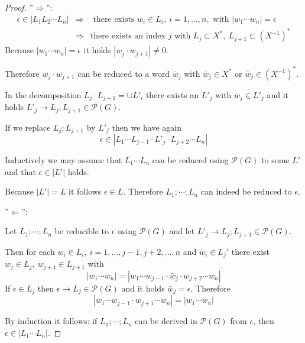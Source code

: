 \begin{proof}

''$\Rightarrow$'':
\begin{eqnarray*}
\epsilon \in |L_1 L_2 \cdots L_n| & \Rightarrow & \text{ there exists } w_i \in
L_i,\ i = 1, \ldots, n,\text{ with }|w_1 \cdots w_n| = \epsilon \\
& \Rightarrow & \text{there exists an index $j$ with }L_j \subset X^*,\ L_{j+1}
\subset (X^{-1})^*
\end{eqnarray*}
Because $|w_1 \cdots w_n| = \epsilon$ it holds $|w_j \cdot w_{j+1}| \neq 0$.

Therefore $w_j \cdot w_{j+1}$ can be reduced to a word $\bar{w}_j$ with
$\bar{w}_j \in X^*$ or $\bar{w}_j \in (X^{-1})^*$.

In the decomposition $L_j \cdot L_{j+1} = \cup L'_i$ there exists an $L'_j$ with
$\bar{w}_j \in L'_j$ and it holds $L'_j \to L_j;L_{j+1} \in \mathcal{P}(G)$.

If we replace $L_j;L_{j+1}$ by $L'_j$ then we have again
\[ \epsilon \in |L_1 \cdots L_{j-1} \cdot L'_j \cdot L_{j+2} \cdots L_n| \]

Inductively we may assume that $L_1 \cdots L_n$ can be reduced using
$\mathcal{P}(G)$ to some $L'$ and that $\epsilon \in |L'|$ holds.

Because $|L'| = L$ it follows $\epsilon \in L$. Therefore $L_1; \cdots ;L_n$ can
indeed be reduced to $\epsilon$.

''$\Leftarrow$'':

Let $L_1; \cdots ;L_n$ be reducible to $\epsilon$ using $\mathcal{P}(G)$ and let
$L'_j \to L_j;L_{j+1} \in \mathcal{P}(G)$.

Then for each $w_i \in L_i,\ i = 1, \ldots, j-1, j+2, \ldots, n$ and $\bar{w}_i
\in L_j'$ there exist $w_j \in L_j,\ w_{j+1} \in L_{j+1}$ with
\[ |w_1 \cdots w_n| = |w_1 \cdots w_{j-1} \cdot \bar{w}_j \cdot w_{j+2} \cdots
w_n|
\]
If $\epsilon \in L_j$ then $\epsilon \to L_j \in \mathcal{P}(G)$ and it holds
$\bar{w}_j = \epsilon$. Therefore
\[ |w_1 \cdots w_{j-1} \cdot w_{j+1} \cdots w_n| = |w_1 \cdots w_n| \]

By induction it follows: if $L_1; \cdots ;L_n$ can be derived in
$\mathcal{P}(G)$ from $\epsilon$, then $\epsilon \in |L_1 \cdots L_n|$.
\end{proof}

